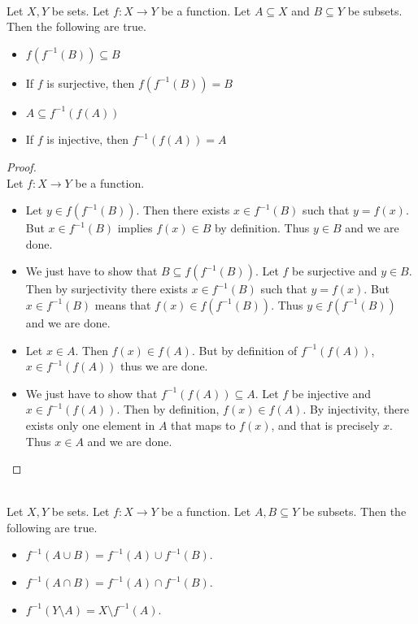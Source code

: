 \documentclass[a4paper]{article}
\begin{document}
\begin{prp}{}{}\\
Let $X,Y$ be sets. Let $f:X\to Y$ be a function. Let $A\subseteq X$ and $B\subseteq Y$ be subsets. Then the following are true. 
\begin{itemize}
\item $f(f^{-1}(B))\subseteq B$
\item If $f$ is surjective, then $f(f^{-1}(B))=B$
\item $A\subseteq f^{-1}(f(A))$
\item If $f$ is injective, then $f^{-1}(f(A))=A$
\end{itemize} 
\begin{proof}\\
Let $f:X\to Y$ be a function. 
\begin{itemize}
\item Let $y\in f(f^{-1}(B))$. Then there exists $x\in f^{-1}(B)$ such that $y=f(x)$. But $x\in f^{-1}(B)$ implies $f(x)\in B$ by definition. Thus $y\in B$ and we are done. 
\item We just have to show that $B\subseteq f(f^{-1}(B))$. Let $f$ be surjective and $y\in B$. Then by surjectivity there exists $x\in f^{-1}(B)$ such that $y=f(x)$. But $x\in f^{-1}(B)$ means that $f(x)\in f(f^{-1}(B))$. Thus $y\in f(f^{-1}(B))$ and we are done. 
\item Let $x\in A$. Then $f(x)\in f(A)$. But by definition of $f^{-1}(f(A))$, $x\in f^{-1}(f(A))$ thus we are done. 
\item We just have to show that $f^{-1}(f(A))\subseteq A$. Let $f$ be injective and $x\in f^{-1}(f(A))$. Then by definition, $f(x)\in f(A)$. By injectivity, there exists only one element in $A$ that maps to $f(x)$, and that is precisely $x$. Thus $x\in A$ and we are done. 
\end{itemize}
\end{proof}
\end{prp}

\begin{prp}{}{}\\
Let $X,Y$ be sets. Let $f:X\to Y$ be a function. Let $A,B\subseteq Y$ be subsets. Then the following are true. 
\begin{itemize}
\item $f^{-1}(A\cup B)=f^{-1}(A)\cup f^{-1}(B)$. 
\item $f^{-1}(A\cap B)=f^{-1}(A)\cap f^{-1}(B)$. 
\item $f^{-1}(Y\setminus A)=X\setminus f^{-1}(A)$. 
\end{itemize} 
\end{prp}
\end{document}
